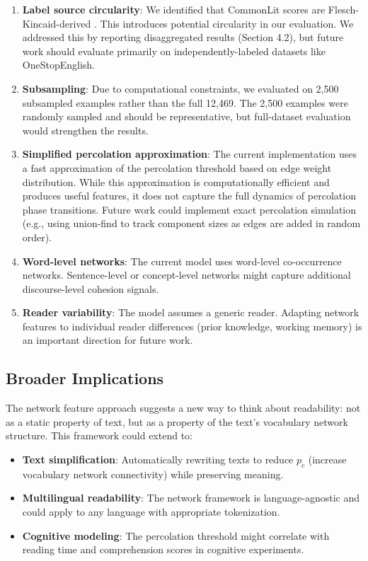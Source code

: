\documentclass[11pt,letterpaper]{article}
\begin{document}
\begin{enumerate}
\item \textbf{Label source circularity}: We identified that CommonLit scores are Flesch-Kincaid-derived \cite{Crossley2022}. This introduces potential circularity in our evaluation. We addressed this by reporting disaggregated results (Section 4.2), but future work should evaluate primarily on independently-labeled datasets like OneStopEnglish.

\item \textbf{Subsampling}: Due to computational constraints, we evaluated on 2,500 subsampled examples rather than the full 12,469. The 2,500 examples were randomly sampled and should be representative, but full-dataset evaluation would strengthen the results.

\item \textbf{Simplified percolation approximation}: The current implementation uses a fast approximation of the percolation threshold based on edge weight distribution. While this approximation is computationally efficient and produces useful features, it does not capture the full dynamics of percolation phase transitions. Future work could implement exact percolation simulation (e.g., using union-find to track component sizes as edges are added in random order).

\item \textbf{Word-level networks}: The current model uses word-level co-occurrence networks. Sentence-level or concept-level networks might capture additional discourse-level cohesion signals.

\item \textbf{Reader variability}: The model assumes a generic reader. Adapting network features to individual reader differences (prior knowledge, working memory) is an important direction for future work.
\end{enumerate}

\subsection{Broader Implications}

The network feature approach suggests a new way to think about readability: not as a static property of text, but as a property of the text's vocabulary network structure. This framework could extend to:

\begin{itemize}
\item \textbf{Text simplification}: Automatically rewriting texts to reduce $p_c$ (increase vocabulary network connectivity) while preserving meaning.
\item \textbf{Multilingual readability}: The network framework is language-agnostic and could apply to any language with appropriate tokenization.
\item \textbf{Cognitive modeling}: The percolation threshold might correlate with reading time and comprehension scores in cognitive experiments.
\end{itemize}
\end{document}
